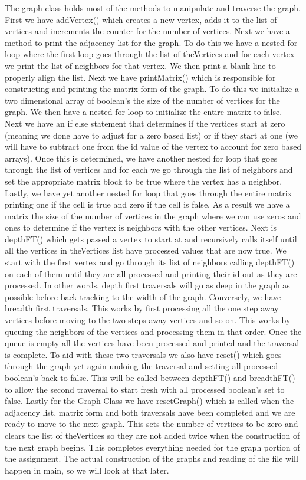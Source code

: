 \documentclass{article}
\begin{document}
The graph class holds most of the methods to manipulate and traverse the graph. First we have addVertex() which creates a new vertex, adds it to the list of vertices and increments the counter for the number of vertices. Next we have a method to print the adjacency list for the graph. To do this we have a nested for loop where the first loop goes through the list of theVertices and for each vertex we print the list of neighbors for that vertex. We then print a blank line to properly align the list. Next we have printMatrix() which is responsible for constructing and printing the matrix form of the graph. To do this we initialize a two dimensional array of boolean's the size of the number of vertices for the graph. We then have a nested for loop to initialize the entire matrix to false. Next we have an if else statement that determines if the vertices start at zero (meaning we done have to adjust for a zero based list) or if they start at one (we will have to subtract one from the id value of the vertex to account for zero based arrays). Once this is determined, we have another nested for loop that goes through the list of vertices and for each we go through the list of neighbors and set the appropriate matrix block to be true where the vertex has a neighbor. Lastly, we have yet another nested for loop that goes through the entire matrix printing one if the cell is true and zero if the cell is false. As a result we have a matrix the size of the number of vertices in the graph where we can use zeros and ones to determine if the vertex is neighbors with the other vertices. Next is depthFT() which gets passed a vertex to start at and recursively calls itself until all the vertices in theVertices list have processed values that are now true. We start with the first vertex and go through its list of neighbors calling depthFT() on each of them until they are all processed and printing their id out as they are processed. In other words, depth first traversals will go as deep in the graph as possible before back tracking to the width of the graph. Conversely, we have breadth first traversals. This works by first processing all the one step away vertices before moving to the two steps away vertices and so on. This works by queuing the neighbors of the vertices and processing them in that order. Once the queue is empty all the vertices have been processed and printed and the traversal is complete. To aid with these two traversals we also have reset() which goes through the graph yet again undoing the traversal and setting all processed boolean's back to false. This will be called between depthFT() and breadthFT() to allow the second traversal to start fresh with all processed boolean's set to false. Lastly for the Graph Class we have resetGraph() which is called when the adjacency list, matrix form and both traversals have been completed and we are ready to move to the next graph. This sets the number of vertices to be zero and clears the list of theVertices so they are not added twice when the construction of the next graph begins. This completes everything needed for the graph portion of the assignment. The actual construction of the graphs and reading of the file will happen in main, so we will look at that later. 
\end{document}
